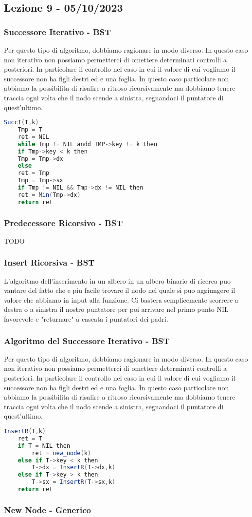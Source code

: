 \subsection{Lezione 9 - 05/10/2023}

\subsubsection{Successore Iterativo - BST}

Per questo tipo di algoritmo, dobbiamo ragionare in modo diverso. In questo caso non iterativo non possiamo permetterci di omettere determinati controlli a posteriori. In particolare il controllo nel caso in cui il valore di cui vogliamo il successore non ha figli destri ed e una foglia. In questo caso particolare non abbiamo la possibilita di risalire a ritroso ricorsivamente ma dobbiamo tenere traccia ogni volta che il nodo scende a sinistra, segnandoci il puntatore di quest'ultimo.

\begin{lstlisting}[language=Java]
	SuccI(T,k)
	Tmp = T
	ret = NIL
	while Tmp != NIL andd TMP->key != k then
	if Tmp->key < k then
	Tmp = Tmp->dx
	else 
	ret = Tmp
	Tmp = Tmp->sx
	if Tmp != NIL && Tmp->dx != NIL then
	ret = Min(Tmp->dx)
	return ret
\end{lstlisting}

\subsubsection{Predecessore Ricorsivo - BST}
TODO

\subsubsection{Insert Ricorsiva - BST}

L'algoritmo dell'inserimento in un albero in un albero binario di ricerca puo vantare del fatto che e piu facile trovare il nodo nel quale si puo aggiungere il valore che abbiamo in input alla funzione. Ci bastera semplicemente scorrere a destra o a sinistra il nostro puntatore per poi arrivare nel primo punto NIL favorevole e "returnare" a cascata i puntatori dei padri.

\subsubsection{Algoritmo del Successore Iterativo - BST}

Per questo tipo di algoritmo, dobbiamo ragionare in modo diverso. In questo caso non iterativo non possiamo permetterci di omettere determinati controlli a posteriori. In particolare il controllo nel caso in cui il valore di cui vogliamo il successore non ha figli destri ed e una foglia. In questo caso particolare non abbiamo la possibilita di risalire a ritroso ricorsivamente ma dobbiamo tenere traccia ogni volta che il nodo scende a sinistra, segnandoci il puntatore di quest'ultimo.

\begin{lstlisting}[language=Java]
	InsertR(T,k)
	ret = T
	if T = NIL then
		ret = new_node(k)
	else if T->key < k then
		T->dx = InsertR(T->dx,k)
	else if T->key > k then
		T->sx = InsertR(T->sx,k)
	return ret
\end{lstlisting}

\subsubsection{New Node - Generico}
